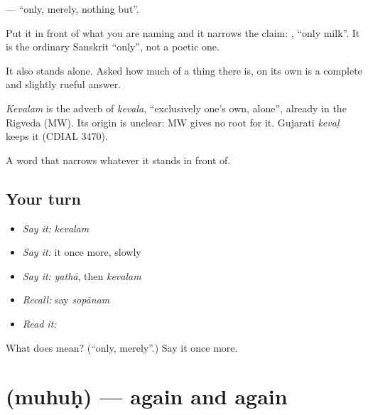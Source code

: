 \textbf{} — \textquotedblleft{}only, merely, nothing but\textquotedblright{}.

Put it in front of what you are naming and it narrows the claim: \textbf{} , \textquotedblleft{}only milk\textquotedblright{}. It is the ordinary Sanskrit \textquotedblleft{}only\textquotedblright{}, not a poetic one.

It also stands alone. Asked how much of a thing there is, \textbf{} on its own is a complete and slightly rueful answer.

\begin{cousinweb}
\emph{Kevalam} is the adverb of \emph{kevala}, \textquotedblleft{}exclusively one's own, alone\textquotedblright{}, already in the Rigveda (MW). Its origin is unclear: MW gives no root for it. Gujarati \emph{kevaḷ} keeps it (CDIAL 3470).
\end{cousinweb}

\begin{grammarlens}[title={What you've built}]
A word that narrows whatever it stands in front of.
\end{grammarlens}

\subsection*{Your turn}
\begin{itemize}
\raggedright
  \item \emph{Say it:} \emph{kevalam}
  \item \emph{Say it:} it once more, slowly
  \item \emph{Say it:} \emph{yathā}, then \emph{kevalam}
  \item \emph{Recall:} say \emph{sopānam}
  \item \emph{Read it:} \textbf{}
\end{itemize}

\begin{tcolorbox}[breakable,colback=teal!4,colframe=teal!35!black,title={Before you move on}]
What does  mean? (\textquotedblleft{}only, merely\textquotedblright{}.) Say it once more.
\end{tcolorbox}
\section[\texorpdfstring{\sk{मुहुः} (muhuḥ)}{मुहुः (muhuḥ)}]{ (muhuḥ) — again and again}

\label{lesson:SA-C49-again-and-again}



